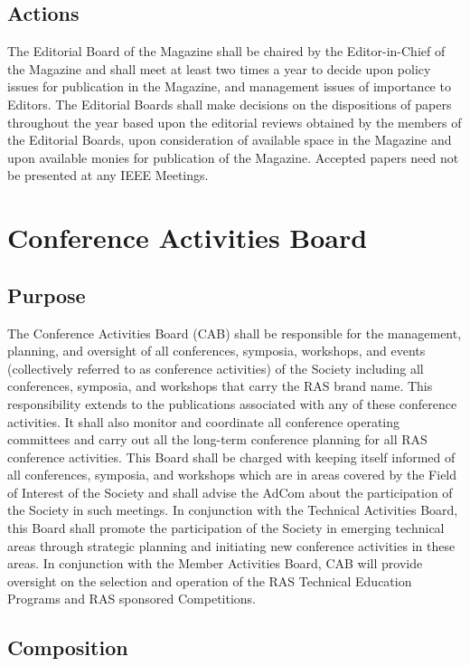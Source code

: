 \documentclass[10pt]{article}
\begin{document}
\subsection{Actions}
The Editorial Board of the Magazine shall be chaired by the Editor-in-Chief of the Magazine and shall meet at least two times a year to decide upon policy issues for publication in the Magazine, and management issues of importance to Editors.  The Editorial Boards shall make decisions on the dispositions of papers throughout the year based upon the editorial reviews obtained by the members of the Editorial Boards, upon consideration of available space in the Magazine and upon available monies for publication of the Magazine. Accepted papers need not be presented at any IEEE Meetings.


\section{Conference Activities Board}
\label{CAB}

\subsection{Purpose}

The Conference Activities Board (CAB) shall be responsible for the management, planning, and oversight of all conferences, symposia, workshops, and events (collectively referred to as conference activities) of the Society including all conferences, symposia, and workshops that carry the RAS brand name.  This responsibility extends to the publications associated with any of these conference activities. It shall also monitor and coordinate all conference operating committees and carry out all the long-term conference planning for all RAS conference activities. This Board shall be charged with keeping itself informed of all conferences, symposia, and workshops which are in areas covered by the Field of Interest of the Society and shall advise the AdCom about the participation of the Society in such meetings. In conjunction with the Technical Activities Board, this Board shall promote the participation of the Society in emerging technical areas through strategic planning and initiating new conference activities in these areas. In conjunction with the Member Activities Board, CAB will provide oversight on the selection and operation of the RAS Technical Education Programs and RAS sponsored Competitions. 


\subsection{Composition}
\end{document}
